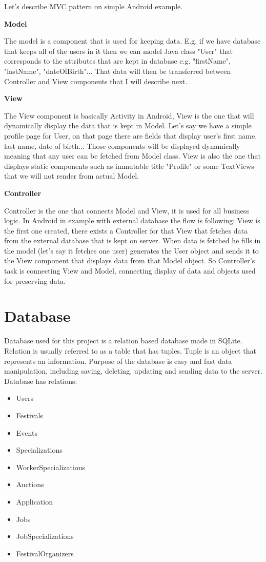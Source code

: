 Let's describe MVC pattern on simple Android example.

\textbf{Model}

The model is a component that is used for keeping data. E.g. if we have database that keeps all of the users in it then we can model Java class "User" that corresponds to the attributes that are kept in database e.g. "firstName", "lastName", "dateOfBirth"... That data will then be transferred between Controller and View components that I will describe next.

\textbf{View}

The View component is basically Activity in Android, View is the one that will dynamically display the data that is kept in Model. Let's say we have a simple profile page for User, on that page there are fields that display user's first name, last name, date of birth... Those components will be displayed dynamically meaning that any user can be fetched from Model class. View is also the one that displays static components such as immutable title "Profile" or some TextViews that we will not render from actual Model.

\textbf{Controller}

Controller is the one that connects Model and View, it is used for all business logic. In Android in example with external database the flow is following: View is the first one created, there exists a Controller for that View that fetches data from the external database that is kept on server. When data is fetched he fills in the model (let's say it fetches one user) generates the User object and sends it to the View component that displays data from that Model object. So Controller's task is connecting View and Model, connecting display of data and objects used for preserving data.
\pagebreak


\section{Database}

Database used for this project is a relation based database made in SQLite. Relation is usually referred to as a table that has tuples. Tuple is an object that represents an information. Purpose of the database is easy and fast data manipulation, including saving, deleting, updating and sending data to the server. Database has relations:
\begin{itemize}
	\item 	 Users
	\item 	 Festivals
	\item 	 Events
	\item 	 Specializations
	\item 	 WorkerSpecializations
	\item 	 Auctions
	\item 	 Application
	\item 	 Jobs
	\item 	 JobSpecializations
	\item 	 FestivalOrganizers
	
\end{itemize}
\pagebreak
